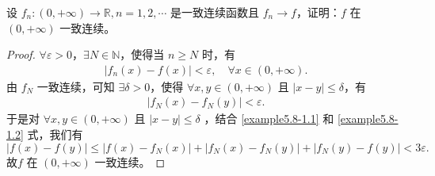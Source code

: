 \documentclass[../../main.tex]{subfiles}
\begin{document}
\begin{example}
设 \( f_n : (0, +\infty) \to \mathbb{R}, n = 1, 2, \cdots \) 是一致连续函数且 \( f_n \rightarrow f \)，证明：\( f \) 在 \( (0, +\infty) \) 一致连续。
\end{example}
\begin{proof}
$\forall \varepsilon > 0$，$\exists N \in \mathbb{N}$，使得当 $n \geqslant N$ 时，有
\begin{align}
\left| f_n\left( x \right) - f\left( x \right) \right| < \varepsilon, \quad \forall x \in \left( 0, +\infty \right). \label{example5.8-1.1}
\end{align}
由 $f_N$ 一致连续，可知 $\exists \delta > 0$，使得 $\forall x, y \in \left( 0, +\infty \right)$ 且 $\left| x - y \right| \leqslant \delta$，有
\begin{align}
\left| f_N\left( x \right) - f_N\left( y \right) \right| < \varepsilon. \label{example5.8-1.2}
\end{align}
于是对 $\forall x, y \in \left( 0, +\infty \right)$ 且 $\left| x - y \right| \leqslant \delta$ ，结合 \eqref{example5.8-1.1} 和 \eqref{example5.8-1.2} 式，我们有
\[
\left| f\left( x \right) - f\left( y \right) \right| \leqslant \left| f\left( x \right) - f_N\left( x \right) \right| + \left| f_N\left( x \right) - f_N\left( y \right) \right| + \left| f_N\left( y \right) - f\left( y \right) \right| < 3\varepsilon.
\]
故\( f \) 在 \( (0, +\infty) \) 一致连续。
\end{proof}
\end{document}
